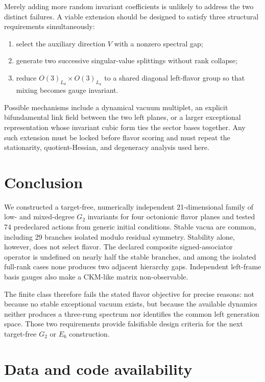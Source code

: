 \documentclass[11pt]{article}
\begin{document}
Merely adding more random invariant coefficients is unlikely to address the two distinct failures.  A viable extension should be designed to satisfy three structural requirements simultaneously:
\begin{enumerate}
  \item select the auxiliary direction $V$ with a nonzero spectral gap;
  \item generate two successive singular-value splittings without rank collapse;
  \item reduce $O(3)_{L_d}\times O(3)_{L_u}$ to a shared diagonal left-flavor group so that mixing becomes gauge invariant.
\end{enumerate}
Possible mechanisms include a dynamical vacuum multiplet, an explicit bifundamental link field between the two left planes, or a larger exceptional representation whose invariant cubic form ties the sector bases together.  Any such extension must be locked before flavor scoring and must repeat the stationarity, quotient-Hessian, and degeneracy analysis used here.

\section{Conclusion}

We constructed a target-free, numerically independent 21-dimensional family of low- and mixed-degree $G_2$ invariants for four octonionic flavor planes and tested 74 predeclared actions from generic initial conditions.  Stable vacua are common, including 29 branches isolated modulo residual symmetry.  Stability alone, however, does not select flavor.  The declared composite signed-associator operator is undefined on nearly half the stable branches, and among the isolated full-rank cases none produces two adjacent hierarchy gaps.  Independent left-frame basis gauges also make a CKM-like matrix non-observable.

The finite class therefore fails the stated flavor objective for precise reasons: not because no stable exceptional vacuum exists, but because the available dynamics neither produces a three-rung spectrum nor identifies the common left generation space.  Those two requirements provide falsifiable design criteria for the next target-free $G_2$ or $E_6$ construction.

\section*{Data and code availability}
\end{document}
